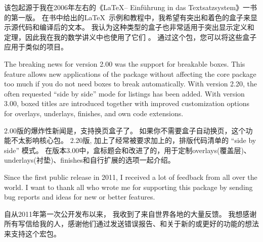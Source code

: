 该包起源于我在2006年左右的《\LaTeX -- Einführung in das Textsatzsystem》一书的第一版。
在书中给出的\LaTeX\ 示例和教程中，我希望有突出和着色的盒子来显示源代码和编译后的文本。
我认为这种类型的盒子也非常适用于突出显示定义和定理，因此我在我的数学讲义中也使用了它们%
。
通过这个包，您可以将这些盒子应用于类似的项目。




The breaking news for version 2.00 was the support for breakable boxes.%
This feature allows new applications of the package without affecting the core package too much if you do not need boxes to break automatically.%
With version 2.20, the often requested \enquote{side by side} mode for listings has been added.%
With version 3.00, boxed titles are introduced together with improved customization options for overlays, underlays, finishes, and own code extensions.%

2.00版的爆炸性新闻是，支持换页盒子了。%
如果你不需要盒子自动换页，这个功能不太影响核心包。%
2.20版, 加上了经常被要求加上的，排版代码清单的 \enquote{side by side} 模式。%
在版本3.00中，盒标题会和改进了的，用于定制overlays(覆盖层)、underlays(衬垫)、finishes和自行扩展的选项一起介绍。


\begin{tcolorbox}[enhanced,%
boxrule=0mm,boxsep=0mm,%
frame hidden,interior hidden,%
left=0mm,right=0mm,top=0mm,bottom=0mm,%
watermark opacity=0.25,watermark zoom=1.2,%
before=\par\smallskip,%
clip watermark=false,%
watermark tikz={%
\path[fill=yellow,draw=yellow!75!red] (0,0) circle (1cm);%
\fill[red] (45:5mm) circle (1mm);\fill[red] (135:5mm) circle (1mm);%
\draw[line width=1mm,red] (215:5mm) arc (215:325:5mm);}]%
Since the first public release in 2011, %
I received a lot of feedback from all over the world.%
I want to thank all who wrote me for supporting this package by sending bug reports and ideas for new or better features.

自从2011年第一次公开发布以来，%
我收到了来自世界各地的大量反馈。%
我想感谢所有写信给我的人，感谢他们通过发送错误报告、和关于新的或更好的功能的想法来支持这个宏包。
\end{tcolorbox}
    


